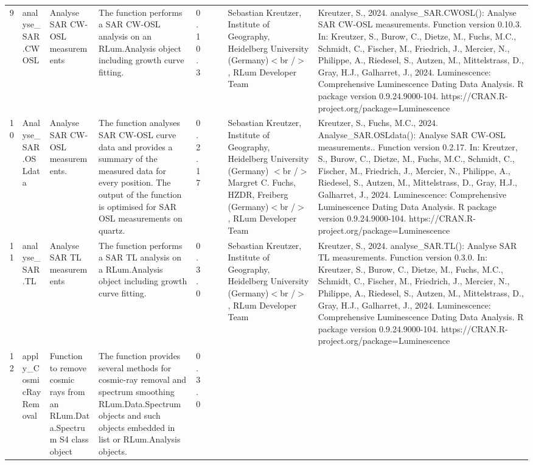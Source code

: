 \begin{table}[ht]
\begin{tabular}{rllllllll}
  9 & analyse\_SAR.CWOSL & Analyse SAR CW-OSL measurements & The function performs a SAR CW-OSL analysis on an RLum.Analysis  object including growth curve fitting. & 0.10.3
 &  &  & Sebastian Kreutzer, Institute of Geography, Heidelberg University (Germany)$<$br /$>$ , RLum Developer Team & Kreutzer, S., 2024. analyse\_SAR.CWOSL(): Analyse SAR CW-OSL measurements. Function version 0.10.3. In: Kreutzer, S., Burow, C., Dietze, M., Fuchs, M.C., Schmidt, C., Fischer, M., Friedrich, J., Mercier, N., Philippe, A., Riedesel, S., Autzen, M., Mittelstrass, D., Gray, H.J., Galharret, J., 2024. Luminescence: Comprehensive Luminescence Dating Data Analysis. R package version 0.9.24.9000-104. https://CRAN.R-project.org/package=Luminescence
 \\ 
  10 & Analyse\_SAR.OSLdata & Analyse SAR CW-OSL measurements. & The function analyses SAR CW-OSL curve data and provides a summary of the measured data for every position. The output of the function is optimised for SAR OSL measurements on quartz. & 0.2.17
 &  &  & Sebastian Kreutzer, Institute of Geography, Heidelberg University (Germany) $<$br /$>$ Margret C. Fuchs, HZDR, Freiberg (Germany)$<$br /$>$ , RLum Developer Team & Kreutzer, S., Fuchs, M.C., 2024. Analyse\_SAR.OSLdata(): Analyse SAR CW-OSL measurements.. Function version 0.2.17. In: Kreutzer, S., Burow, C., Dietze, M., Fuchs, M.C., Schmidt, C., Fischer, M., Friedrich, J., Mercier, N., Philippe, A., Riedesel, S., Autzen, M., Mittelstrass, D., Gray, H.J., Galharret, J., 2024. Luminescence: Comprehensive Luminescence Dating Data Analysis. R package version 0.9.24.9000-104. https://CRAN.R-project.org/package=Luminescence
 \\ 
  11 & analyse\_SAR.TL & Analyse SAR TL measurements & The function performs a SAR TL analysis on a RLum.Analysis  object including growth curve fitting. & 0.3.0
 &  &  & Sebastian Kreutzer, Institute of Geography, Heidelberg University (Germany)$<$br /$>$ , RLum Developer Team & Kreutzer, S., 2024. analyse\_SAR.TL(): Analyse SAR TL measurements. Function version 0.3.0. In: Kreutzer, S., Burow, C., Dietze, M., Fuchs, M.C., Schmidt, C., Fischer, M., Friedrich, J., Mercier, N., Philippe, A., Riedesel, S., Autzen, M., Mittelstrass, D., Gray, H.J., Galharret, J., 2024. Luminescence: Comprehensive Luminescence Dating Data Analysis. R package version 0.9.24.9000-104. https://CRAN.R-project.org/package=Luminescence
 \\ 
  12 & apply\_CosmicRayRemoval & Function to remove cosmic rays from an RLum.Data.Spectrum S4 class object & The function provides several methods for cosmic-ray removal and spectrum smoothing  RLum.Data.Spectrum  objects and such objects embedded in  list  or RLum.Analysis  objects. & 0.3.0

\end{tabular}
\end{table}
